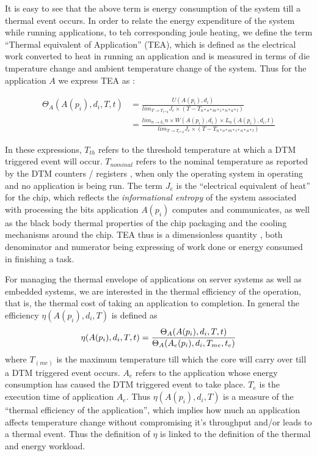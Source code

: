 \documentclass{amsart}
\newcommand{\tmtextit}[1]{{\itshape{#1}}}
\begin{document}
It is easy to see that the above term is energy consumption of the system till
a thermal event occurs. In order to relate the energy expenditure of the
system while running applications, to teh corresponding joule heating, we
define the term ``Thermal equivalent of Application'' (TEA), which is defined
as the electrical work converted to heat in running an application and is
measured in terms of die tmperature change and ambient temperature change of
the system. Thus for the application $A$ we express TEA as :

\begin{align*}
  {\Theta}_A(A(p_i),d_i,T,t) &
  ={\frac{U(A(p_i),d_i)}{lim_{T{\to}T_{t*h}}J_e{\times}(T-T_{n*o*m*i*n*a*l})}}\\
  &
  ={\frac{lim_{n{\to}k_e}n{\times}W(A(p_i),d_i){\times}L_n(A(p_i),d_i,t)}{lim_{T{\to}T_{t*h}}J_e{\times}(T-T_{n*o*m*i*n*a*l})}}
\end{align*}

In these expressions, $T_{th}$ refers to the threshold temperature at which a
DTM triggered event will occur. $T_{nominal}$ refers to the nominal
temperature as reported by the DTM counters / registers , when only the
operating system in operating and no application is being run. The term $J_e$
is the ``electrical equivalent of heat'' for the chip, which reflects the
\tmtextit{informational entropy} of the system associated with processing the
bits application $A (p_i)$ computes and communicates, as well as the black
body thermal properties of the chip packaging and the cooling mechanisms
around the chip. TEA thus is a dimensionless quantity , both denominator and
numerator being expressing of work done or energy consumed in finishing a
task.

For managing the thermal envelope of applications on server systems as well as
embedded systems, we are interested in the thermal efficiency of the
operation, that is, the thermal cost of taking an application to completion.
In general the efficiency $\eta (A (p_i), d_i, T)$ is defined as
\[ \eta (A (p_i), d_i, T, t) = \frac{\Theta_A (A (p_i), d_i, T, t)}{\Theta_A
   (A_e (p_i), d_i, T_{me}, t_e)} \\
   \]
where $T_( me)$ is the maximum temperature till which the core will carry over
till a DTM triggered event occurs. $A_e$ refers to the application whose
energy consumption has caused the DTM triggered event to take place. $T_e$ is
the execution time of application $A_e$. Thus $\eta (A (p_i), d_i, T)$ is a
measure of the ``thermal efficiency of the application'', which implies how
much an application affects temperature change without compromising it's
throughput and/or leads to a thermal event. Thus the definition of $\eta$ is
linked to the definition of the thermal and energy workload.
\end{document}
